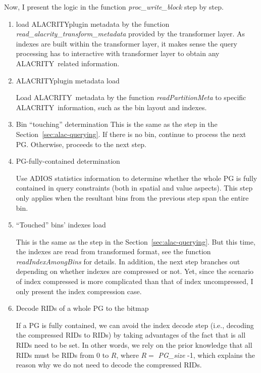 \documentclass[11pt,a4paper]{article}
\newcommand{\alac}{ALACRITY}
\begin{document}
Now, I present the logic in the function \emph{proc\_write\_block} step by step. 
\begin{enumerate}
\item load \alac\-plugin metadata by the function \emph{read\_alacrity\_transform\_metadata} provided by the transformer layer. As indexes are built within the transformer layer, it makes sense the query processing has to interactive with transformer layer to obtain any \alac\ related information. 

\item \alac\-plugin metadata load

Load \alac\ metadata by the function \emph{readPartitionMeta} to specific \alac\ information, such as the bin layout and indexes. 

\item Bin ``touching'' determination
This is the same as the step in the Section~\ref{sec:alac-querying}. If there is no bin, continue to process the next PG. Otherwise, proceeds to the next step.

\item PG-fully-contained determination

Use ADIOS statistics information to determine whether the whole PG is fully contained in query constraints (both in spatial and value aspects). This step only applies when the resultant bins from the previous step span the entire bin. 

\item ``Touched'' bins' indexes load

This is the same as the step in the Section~\ref{sec:alac-querying}. 
But this time, the indexes are read from transformed format, see the function \emph{readIndexAmongBins} for details.
In addition, the next step branches out depending on whether indexes are compressed or not. Yet, since the scenario of index compressed is more complicated than that of index uncompressed, I only present the index compression case. 

\item Decode RIDs of a whole PG to the bitmap

If a PG is fully contained,  we can avoid the index decode step (i.e., decoding the compressed RIDs to RIDs) by taking advantages of the fact that is all RIDs need to be set. 
In other words, we rely on the prior knowledge that all RIDs must be RIDs from 0 to $R$, where $R = $ \emph{PG\_size} -1, which explains the reason why we do not need to decode the compressed RIDs. 


\end{enumerate}
\end{document}
